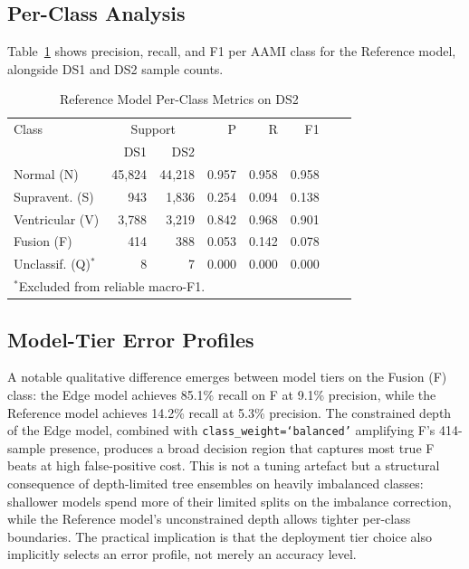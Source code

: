 \documentclass[journal,twoside]{IEEEtran}
\begin{document}
\subsection{Per-Class Analysis}

Table~\ref{tab:perclass} shows precision, recall, and F1 per AAMI class
for the Reference model, alongside DS1 and DS2 sample counts.

\begin{table}[htbp]
\caption{Reference Model Per-Class Metrics on DS2}
\label{tab:perclass}
\centering
\begin{tabular}{lrrrrrrr}
\toprule
Class & \multicolumn{2}{c}{Support} & P & R & F1 \\
      & DS1 & DS2 & & & \\
\midrule
Normal (N)         & 45{,}824 & 44{,}218 & 0.957 & 0.958 & 0.958 \\
Supravent. (S)     &    943   &  1{,}836 & 0.254 & 0.094 & 0.138 \\
Ventricular (V)    &  3{,}788 &  3{,}219 & 0.842 & 0.968 & 0.901 \\
Fusion (F)         &    414   &    388   & 0.053 & 0.142 & 0.078 \\
Unclassif. (Q)$^*$&      8   &      7   & 0.000 & 0.000 & 0.000 \\
\bottomrule
\multicolumn{7}{l}{\small $^*$Excluded from reliable macro-F1.}
\end{tabular}
\end{table}

\subsection{Model-Tier Error Profiles}

A notable qualitative difference emerges between model tiers on the
Fusion (F) class: the Edge model achieves 85.1\% recall on F at 9.1\%
precision, while the Reference model achieves 14.2\% recall at 5.3\%
precision. The constrained depth of the Edge model, combined with
\texttt{class\_weight=`balanced'} amplifying F's 414-sample presence,
produces a broad decision region that captures most true F beats at high
false-positive cost. This is not a tuning artefact but a structural
consequence of depth-limited tree ensembles on heavily imbalanced classes:
shallower models spend more of their limited splits on the imbalance
correction, while the Reference model's unconstrained depth allows tighter
per-class boundaries. The practical implication is that the deployment tier
choice also implicitly selects an error profile, not merely an accuracy level.
\end{document}
